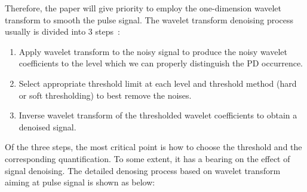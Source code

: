 Therefore, the paper will give priority to employ the one-dimension
wavelet transform to smooth the pulse signal. The wavelet
transform denoising process usually is divided into 3 steps~\cite{polikarwavelet}:
\begin{enumerate}[(1)]
    \item Apply wavelet transform to the noisy signal to produce the
        noisy wavelet coefficients to the level which we can properly
        distinguish the PD occurrence.
    \item Select appropriate threshold limit at each level and
        threshold method (hard or soft thresholding) to best remove
        the noises.
    \item Inverse wavelet transform of the thresholded wavelet
        coefficients to obtain a denoised signal. 
\end{enumerate}
Of the three steps, the most critical point is how to choose the
threshold and the corresponding quantification. To some extent, it
has a bearing on the effect of signal denoising. The detailed denosing
process based on wavelet transform aiming at pulse signal is shown as
below: 
